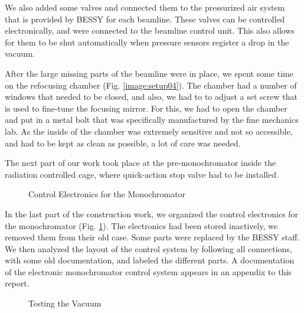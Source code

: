 \documentclass[a4paper,10pt]{article}
\begin{document}
    We also added some valves and connected them to the pressurized air system
that is provided by BESSY for each beamline. These valves can be controlled
electronically, and were connected to the beamline control unit. This also
allows for them to be shut automatically when pressure sensors register a drop
in the vacuum.

    After the large missing parts of the beamline were in place, we spent some
time on the refocusing chamber (Fig. \ref{image:setup04}). The chamber had a
number of windows that needed to be closed, and also, we had to to adjust a set
screw that is used to fine-tune the focusing mirror. For this, we had to open
the chamber and put in a metal bolt that was specifically manufactured by the
fine mechanics lab. As the inside of the chamber was extremely sensitive and not
so accessible, and had to be kept as clean as possible, a lot of care was
needed.

    The next part of our work took place at the pre-monochromator inside the
radiation controlled cage, where quick-action stop valve had to be installed. 

\begin{figure}[thbp]
  \begin{center}
  \end{center}
  \caption{Control Electronics for the Monochromator}
  \label{image:constr04}
\end{figure}

    In the last part of the construction work, we organized the control
electronics for the monochromator (Fig. \ref{image:constr04}). The electronics
had been stored inactively, we removed them from their old case. Some parts
were replaced by the BESSY staff. We then analyzed the layout of the control
system by following all connections, with some old documentation, and
labeled the different parts. A documentation of the electronic monochromator
control system appears in an appendix to this report.

\begin{figure}[htp]
  \begin{center}
  \end{center}
  \caption{Testing the Vacuum}
  \label{image:constr05}
\end{figure}
\end{document}

